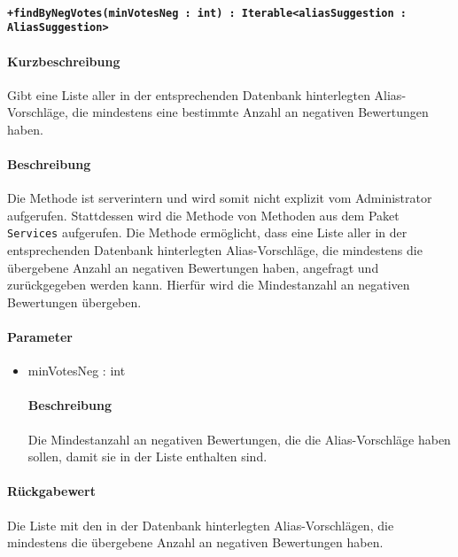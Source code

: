 \paragraph*{\texttt{+findByNegVotes(minVotesNeg : int) : Iterable<aliasSuggestion : AliasSuggestion>}}%
\paragraph*{Kurzbeschreibung}
Gibt eine Liste aller in der entsprechenden Datenbank hinterlegten Alias-Vorschläge, die mindestens eine bestimmte Anzahl an negativen Bewertungen haben.
\paragraph*{Beschreibung}
Die Methode ist serverintern und wird somit nicht explizit vom Administrator aufgerufen.
Stattdessen wird die Methode von Methoden aus dem Paket \texttt{Services} aufgerufen.
Die Methode ermöglicht, dass eine Liste aller in der entsprechenden Datenbank hinterlegten Alias-Vorschläge, die mindestens die übergebene Anzahl an negativen Bewertungen haben, angefragt und zurückgegeben werden kann.
Hierfür wird die Mindestanzahl an negativen Bewertungen übergeben.
\paragraph*{Parameter}
\begin{itemize}
    \item minVotesNeg : int
    		\paragraph*{Beschreibung}
    		Die Mindestanzahl an negativen Bewertungen, die die Alias-Vorschläge haben sollen, damit sie in der Liste enthalten sind.
\end{itemize}
\paragraph*{Rückgabewert}
Die Liste mit den in der Datenbank hinterlegten Alias-Vorschlägen, die mindestens die übergebene Anzahl an negativen Bewertungen haben.
